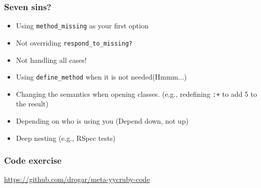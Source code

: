 \begin{frame}\frametitle{Seven sins?}
  \begin{itemize}
    \item Using \lstinline|method_missing| as your first option
    \item Not overriding \lstinline|respond_to_missing?|
    \item Not handling all cases!
    \item Using \lstinline|define_method| when it is not needed(Hmmm...)
    \item Changing the semantics when opening classes. (e.g., redefining \lstinline|:+| to add 5 to the result)
    \item Depending on who is using you (Depend down, not up)
    \item Deep nesting (e.g., RSpec tests)
  \end{itemize}
\end{frame}
\begin{frame}\frametitle{Code exercise}
  \begin{center}
    \url{https://github.com/drogar/meta-yycruby-code}
  \end{center}
\end{frame}





